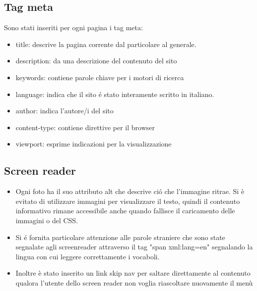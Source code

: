 \documentclass[12pt]{article}
\begin{document}
\begin{itemize}
			\end{itemize}	

			
			\newpage
			\subsection{Tag meta}
			
	 Sono stati inseriti per ogni pagina i tag meta:
	 		\begin{itemize}
				\item title: descrive la pagina corrente dal particolare al generale.
				\item description: da una descrizione del contenuto del sito
				\item keywords: contiene parole chiave per i motori di ricerca
				\item language: indica che il sito \'e stato interamente scritto in italiano.
				\item author: indica l'autore/i del sito
				\item content-type: contiene direttive per il browser
				\item viewport: esprime indicazioni per la visualizzazione
			\end{itemize}
			\subsection{Screen reader}
			\begin{itemize}
				\item Ogni foto ha il suo attributo alt che descrive ci\'o che l'immagine ritrae.
				Si \`e evitato di utilizzare immagini per visualizzare il testo, quindi il contenuto informativo rimane accessibile anche quando fallisce il caricamento delle immagini o del CSS.
				\item Si \'e fornita particolare attenzione alle parole straniere che sono state segnalate agli screenreader attraverso il tag "span xml:lang=en" segnalando la lingua con cui leggere correttamente i vocaboli. 
				\item Inoltre \`e stato inserito un link skip nav per saltare direttamente al contenuto qualora l'utente dello screen reader non voglia riascoltare nuovamente il men\`u
			\end{itemize}
\end{document}
